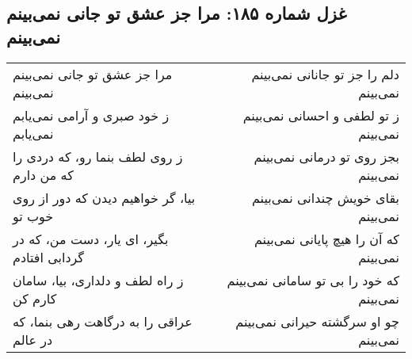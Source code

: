 \begin{center}
\section*{غزل شماره ۱۸۵: مرا جز عشق تو جانی نمی‌بینم نمی‌بینم}
\label{sec:185}
\begin{longtable}{l p{0.5cm} r}
مرا جز عشق تو جانی نمی‌بینم نمی‌بینم
&&
دلم را جز تو جانانی نمی‌بینم نمی‌بینم
\\
ز خود صبری و آرامی نمی‌یابم نمی‌یابم
&&
ز تو لطفی و احسانی نمی‌بینم نمی‌بینم
\\
ز روی لطف بنما رو، که دردی را که من دارم
&&
بجز روی تو درمانی نمی‌بینم نمی‌بینم
\\
بیا، گر خواهیم دیدن که دور از روی خوب تو
&&
بقای خویش چندانی نمی‌بینم نمی‌بینم
\\
بگیر، ای یار، دست من، که در گردابی افتادم
&&
که آن را هیچ پایانی نمی‌بینم نمی‌بینم
\\
ز راه لطف و دلداری، بیا، سامان کارم کن
&&
که خود را بی تو سامانی نمی‌بینم نمی‌بینم
\\
عراقی را به درگاهت رهی بنما، که در عالم
&&
چو او سرگشته حیرانی نمی‌بینم نمی‌بینم
\\
\end{longtable}
\end{center}
